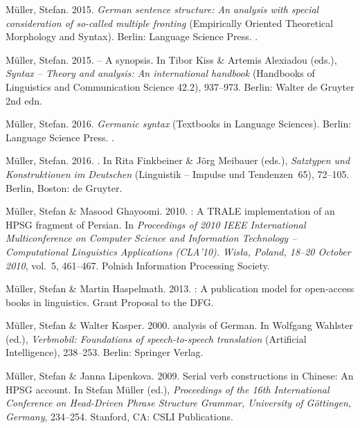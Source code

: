 \begin{thebibliography}{1420}
M{\"u}ller, Stefan. 2015{}.
\newblock \emph{German sentence structure: {An} analysis with special
  consideration of so-called multiple fronting}  (Empirically Oriented
  Theoretical Morphology and Syntax).
\newblock Berlin: Language Science Press.
\newblock \submitted.

M{\"u}ller, Stefan. 2015{}.
 -- {A} synopsis.
\newblock In Tibor Kiss \& Artemis Alexiadou (eds.), \emph{Syntax -- {Theory}
  and analysis: {An} international handbook} (Handbooks of Linguistics and
  Communication Science 42.2), 937--973. Berlin: Walter de Gruyter 2nd edn.

M{\"u}ller, Stefan. 2016{}.
\newblock \emph{Germanic syntax}  (Textbooks in Language Sciences).
\newblock Berlin: Language Science Press.
\newblock \inPreparation.

M{\"u}ller, Stefan. 2016{}.
.
\newblock In Rita Finkbeiner \& J{\"o}rg Meibauer (eds.), \emph{{Satztypen und
  Konstruktionen im Deutschen}} (Linguistik -- Impulse und Tendenzen~65),
  72--105. Berlin, Boston: de Gruyter.

M{\"u}ller, Stefan \& Masood Ghayoomi. 2010.
: {A} {TRALE} implementation of an {HPSG} fragment of
  {Persian}.
\newblock In \emph{Proceedings of {2010 IEEE International Multiconference on
  Computer Science and Information Technology -- Computational Linguistics
  Applications (CLA'10). Wis{\l}a, Poland, 18--20 October 2010}}, vol.~5,
  461--467. Polnish Information Processing Society.

M{\"u}ller, Stefan \& Martin Haspelmath. 2013.
: {A} publication model for open-access books
  in linguistics.
\newblock Grant Proposal to the DFG.

M{\"u}ller, Stefan \& Walter Kasper. 2000.
 analysis of {German}.
\newblock In Wolfgang Wahlster (ed.), \emph{Verbmobil: Foundations of
  speech-to-speech translation}  (Artificial Intelligence), 238--253. Berlin:
  Springer Verlag.

M{\"u}ller, Stefan \& Janna Lipenkova. 2009.
\newblock Serial verb constructions in {Chinese}: {An} {HPSG} account.
\newblock In Stefan M{\"u}ller (ed.), \emph{Proceedings of the {16th
  International Conference on Head-Driven Phrase Structure Grammar, University
  of G{\"o}ttingen, Germany}}, 234--254. Stanford, CA: CSLI Publications.


\end{thebibliography}
